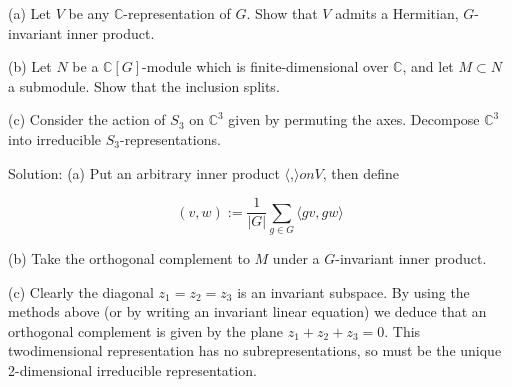 \documentclass[10pt]{article}
\begin{document}
(a) Let $V$ be any $\mathbb{C}$-representation of $G$. Show that $V$ admits a Hermitian, $G$-invariant inner product.

(b) Let $N$ be a $\mathbb{C}[G]$-module which is finite-dimensional over $\mathbb{C}$, and let $M \subset N$ a submodule. Show that the inclusion splits.

(c) Consider the action of $S_{3}$ on $\mathbb{C}^{3}$ given by permuting the axes. Decompose $\mathbb{C}^{3}$ into irreducible $S_{3}$-representations.

Solution: (a) Put an arbitrary inner product $\langle$,$\rangle on V$, then define

$$
(v, w):=\frac{1}{|G|} \sum_{g \in G}\langle g v, g w\rangle
$$

(b) Take the orthogonal complement to $M$ under a $G$-invariant inner product.

(c) Clearly the diagonal $z_{1}=z_{2}=z_{3}$ is an invariant subspace. By using the methods above (or by writing an invariant linear equation) we deduce that an orthogonal complement is given by the plane $z_{1}+z_{2}+z_{3}=0$. This twodimensional representation has no subrepresentations, so must be the unique 2-dimensional irreducible representation.
\end{document}
